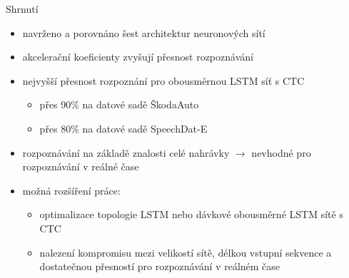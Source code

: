 \documentclass[10pt]{beamer}
\begin{document}
\begin{frame}{Shrnutí}
	\begin{itemize}
		\item navrženo a porovnáno šest architektur neuronových sítí
		\item akcelerační koeficienty zvyšují přesnost rozpoznávání
		\item nejvyšší přesnost rozpoznání pro obousměrnou LSTM síť s CTC
			\begin{itemize}
				\item přes 90\% na datové sadě ŠkodaAuto
				\item přes 80\% na datové sadě SpeechDat-E
			\end{itemize}
		\item rozpoznávání na základě znalosti celé nahrávky $ \rightarrow $ nevhodné pro rozpoznávání v reálné čase
		\item možná rozšíření práce:
			\begin{itemize}
				\item optimalizace topologie LSTM nebo dávkové obousměrné LSTM sítě s CTC
				\item nalezení kompromisu mezi velikostí sítě, délkou vstupní sekvence a dostatečnou přesností pro rozpoznávání v reálném čase
			\end{itemize}
	\end{itemize}
\end{frame}
\end{document}
